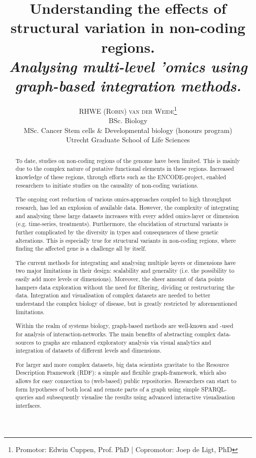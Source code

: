 \documentclass[twoside,fontsize=12pt]{article}
\title{\vspace{-15mm}\fontsize{18pt}{10pt}\normalfont\textbf{Understanding the effects of structural variation in non-coding regions.\\ \vspace{4 mm} {{\footnotesize \textit{Analysing multi-level 'omics using graph-based integration methods.}}}}} %
\author{
\large
\textsc {RHWE (Robin) van der Weide}\thanks{Promotor: Edwin Cuppen, Prof. PhD | Copromotor: Joep de Ligt, PhD}\\[2mm] 
\normalsize  BSc. Biology\\
\normalsize  MSc. Cancer Stem cells \& Developmental biology (honours program)\\
\normalsize  Utrecht Graduate School of Life Sciences \\
\vspace{-5mm}
}
\date{}
\renewcommand{\abstractname}{}    %
\begin{document}
\maketitle %

\thispagestyle{fancy} %

\newpage
\renewcommand{\abstractname}{\begin{center}
Summary of the research
\end{center}}    %

\begin{abstract}
\noindent
To date, studies on non-coding regions of the genome have been limited. This is mainly due to the complex nature of putative functional elements in these regions. Increased knowledge of these regions, through efforts such as the ENCODE-project, enabled researchers to initiate studies on the causality of non-coding variations\cite{Benko2009,Kurth2009}. 

The ongoing cost reduction of various omics-approaches coupled to high throughput research, has led an explosion of available data. However, the complexity of integrating and analysing these large datasets increases with every added omics-layer or dimension (e.g. time-series, treatments). Furthermore, the elucidation of structural variants is further complicated by the diversity in types and consequences of these genetic alterations. This is especially true for structural variants in non-coding regions, where finding the affected gene is a challenge all by itself.
\medskip

\noindent
The current methods for integrating and analysing multiple layers or dimensions have two major limitations in their design: scalability and generality (i.e. the possibility to easily add more levels or dimensions). Moreover, the sheer amount of data points hampers data exploration without the need for filtering, dividing or restructuring the data. Integration and visualisation of complex datasets are needed to better understand the complex biology of disease\cite{Munoz2011}, but is greatly restricted by aforementioned limitations.
\medskip

\noindent Within the realm of systems biology, graph-based methods are well-known and -used for analysis of interaction-networks. The main benefits of abstracting complex data-sources to graphs are enhanced exploratory analysis via visual analytics and integration of datasets of different levels and dimensions. 

For larger and more complex datasets, big data scientists gravitate to the Resource Description Framework (RDF): a simple and flexible graph-framework, which also allows for easy connection to (web-based) public repositories. Researchers can start to form hypotheses of both local and remote parts of a graph using simple SPARQL-queries and subsequently visualise the results using advanced interactive visualisation interfaces. 
\medskip


\end{abstract}
\end{document}
